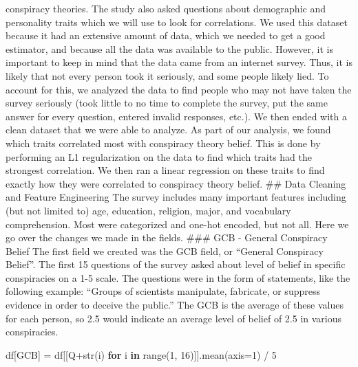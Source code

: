 \documentclass[11pt]{article}
\newenvironment{Shaded}{}{}
\newcommand{\KeywordTok}[1]{\textcolor[rgb]{0.00,0.44,0.13}{\textbf{{#1}}}}
\newcommand{\DecValTok}[1]{\textcolor[rgb]{0.25,0.63,0.44}{{#1}}}
\newcommand{\StringTok}[1]{\textcolor[rgb]{0.25,0.44,0.63}{{#1}}}
\newcommand{\NormalTok}[1]{{#1}}
\newcommand{\ControlFlowTok}[1]{\textcolor[rgb]{0.00,0.44,0.13}{\textbf{{#1}}}}
\newcommand{\OperatorTok}[1]{\textcolor[rgb]{0.40,0.40,0.40}{{#1}}}
\newcommand{\BuiltInTok}[1]{{#1}}
\begin{document}
conspiracy theories. The study also asked questions about demographic
and personality traits which we will use to look for correlations. We
used this dataset because it had an extensive amount of data, which we
needed to get a good estimator, and because all the data was available
to the public. However, it is important to keep in mind that the data
came from an internet survey. Thus, it is likely that not every person
took it seriously, and some people likely lied. To account for this, we
analyzed the data to find people who may not have taken the survey
seriously (took little to no time to complete the survey, put the same
answer for every question, entered invalid responses, etc.). We then
ended with a clean dataset that we were able to analyze. As part of our
analysis, we found which traits correlated most with conspiracy theory
belief. This is done by performing an L1 regularization on the data to
find which traits had the strongest correlation. We then ran a linear
regression on these traits to find exactly how they were correlated to
conspiracy theory belief. \#\# Data Cleaning and Feature Engineering The
survey includes many important features including (but not limited to)
age, education, religion, major, and vocabulary comprehension. Most were
categorized and one-hot encoded, but not all. Here we go over the
changes we made in the fields. \#\#\# GCB - General Conspiracy Belief
The first field we created was the GCB field, or ``General Conspiracy
Belief''. The first 15 questions of the survey asked about level of
belief in specific conspiracies on a 1-5 scale. The questions were in
the form of statements, like the following example: ``Groups of
scientists manipulate, fabricate, or suppress evidence in order to
deceive the public.'' The GCB is the average of these values for each
person, so 2.5 would indicate an average level of belief of 2.5 in
various conspiracies.

\begin{Shaded}
\begin{Highlighting}[]
\NormalTok{df[}\StringTok{\textquotesingle{}GCB\textquotesingle{}}\NormalTok{] }\OperatorTok{=}\NormalTok{ df[[}\StringTok{\textquotesingle{}Q\textquotesingle{}}\OperatorTok{+}\BuiltInTok{str}\NormalTok{(i) }\ControlFlowTok{for}\NormalTok{ i }\KeywordTok{in} \BuiltInTok{range}\NormalTok{(}\DecValTok{1}\NormalTok{, }\DecValTok{16}\NormalTok{)]].mean(axis}\OperatorTok{=}\DecValTok{1}\NormalTok{) }\OperatorTok{/} \DecValTok{5}
\end{Highlighting}
\end{Shaded}
\end{document}
